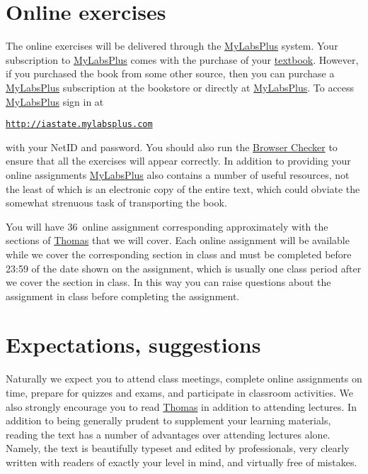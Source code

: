 \documentclass[11pt]{article}
\begin{document}
\section{Online exercises}\label{Online}
The online exercises will be delivered through the
\href{http://iastate.mylabsplus.com}{MyLabsPlus} system.
Your subscription to 
\href{http://iastate.mylabsplus.com}{MyLabsPlus}
comes with the purchase of your
\href{http://wps.aw.com/aw_thomas_calculus_series}{textbook}.
However, if you purchased the book from some other source,
then you can purchase a 
\href{http://iastate.mylabsplus.com}{MyLabsPlus}
subscription at the bookstore or directly at
\href{http://iastate.mylabsplus.com}{MyLabsPlus}.
To access
\href{http://iastate.mylabsplus.com}{MyLabsPlus}
sign in at
\begin{center}
\href{http://iastate.mylabsplus.com}{\tt http://iastate.mylabsplus.com}
\end{center}
with your NetID and password.
You should also run the
\href{https://www.mathxl.com/BrowserCheck/BrowserCheck.aspx?appproductid=3&courseid=2744761&handler_urn=pearson%2fmlp_mml_xl%2fslink%2fx-pearson-mlp_mml_xl&productid=ccng}{Browser Checker}
to ensure that all the exercises will appear correctly.
In addition to providing your online assignments
\href{http://iastate.mylabsplus.com}{MyLabsPlus}
also contains a number of useful resources, not the least of which is an
electronic copy of the entire text, which could obviate
the somewhat strenuous task of transporting the book.

You will have 36~online assignment corresponding
approximately with the sections of 
\href{http://wps.aw.com/aw_thomas_calculus_series}{Thomas}
that we will cover. Each online assignment will be available while we cover the
corresponding section in class and must be completed
before 23:59 of the date shown on the assignment, which
is usually one class period after we cover the section in class.
In this way you can raise questions about
the assignment in class before completing the assignment.

\section{Expectations, suggestions} Naturally we expect you to attend 
class meetings, complete online assignments on 
time, prepare for quizzes and exams, and participate in classroom 
activities. We also strongly encourage you to read
\href{http://wps.aw.com/aw_thomas_calculus_series}{Thomas}
in addition to attending lectures.
In addition to being generally prudent to 
supplement your learning materials, reading the text has a number of 
advantages over attending lectures alone. Namely, the text is beautifully 
typeset and edited by professionals, very clearly written with readers 
of exactly your level in mind, and virtually free of mistakes.
\end{document}
